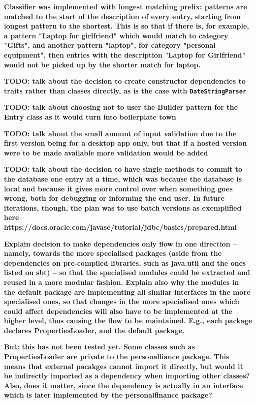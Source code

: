 \textbf{Classifier was implemented with longest matching prefix: patterns are
matched to the start of the description of every entry, starting from longest
pattern to the shortest. This is so that if there is, for example, a pattern
"Laptop for girlfriend" which would match to category "Gifts", and another
pattern "laptop", for category "personal equipment", then entries with the
description "Laptop for Girlfriend" would not be picked up by the shorter match
for laptop.}

\textbf{TODO: talk about the decision to create constructor dependencies to
traits rather than classes directly, as is the case with
\texttt{DateStringParser}}

\textbf{TODO: talk about choosing not to user the Builder pattern for the Entry
class as it would turn into boilerplate town}

\textbf{TODO: talk about the small amount of input validation due to the first
version being for a desktop app only, but that if a hosted version were to be
made available more validation would be added}

\textbf{TODO: talk about the decision to have single methods to commit to the
database one entry at a time, which was because the database is local and
because it gives more control over when something goes wrong, both for
debugging or informing the end user. In future iterations, though, the plan was
to use batch versions as exemplified here
https://docs.oracle.com/javase/tutorial/jdbc/basics/prepared.html}

\textbf{Explain decision to make dependencies only flow in one direction --
namely, towards the more specialised packages (aside from the dependencies on
pre-compiled libraries, such as java.util and the ones listed on sbt) -- so
that the specialised modules could be extracted and reused in a more modular
fashion. Explain also why the modules in the default package are implementing
all similar interfaces in the more specialised ones, so that changes in the
more specialised ones which could affect dependencies will also have to be
implemented at the higher level, thus causing the flow to be maintained. E.g.,
each package declares PropertiesLoader, and the default package.}

\textbf{But: this has not been tested yet. Some classes such as PropertiesLoader are
private to the personalfiance package. This means that external pacakges cannot
import it directly, but would it be indirectly imported as a dependency when
importing other classes? Also, does it matter, since the dependency is actually
in an interface which is later implemented by the personalfinance package?}

